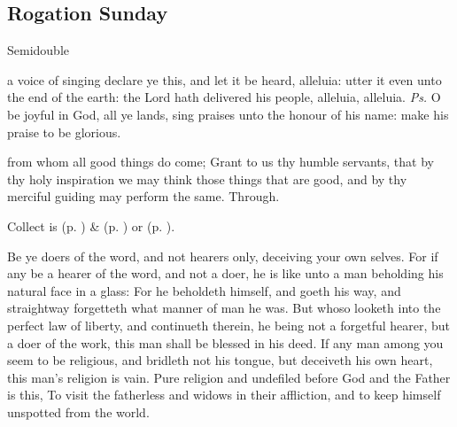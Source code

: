 \clearpage
\subsection{Rogation Sunday}
\begin{inhead}
    {Semidouble}
\end{inhead}


\introit
{} a voice of singing declare ye this, and let it be heard, alleluia: utter it even unto the end of the earth: the Lord hath delivered his people, alleluia, alleluia. \textit{Ps.} O be joyful in God, all ye lands, sing praises unto the honour of his name: make his praise to be glorious.

\collect
{} from whom all good things do come; Grant to us thy humble servants, that by thy holy inspiration we may think those things that are good, and by thy merciful guiding may perform the same. Through.
\begin{rubric}
     Collect is  (p. \pageref{SPMaryInEaster}) \&   (p. \pageref{SPAgainst}) or  (p. \pageref{SPChiefBishop}).
\end{rubric}

 Be ye doers of the word, and not hearers only, deceiving your own selves. For if any be a hearer of the word, and not a doer, he is like unto a man beholding his natural face in a glass: For he beholdeth himself, and goeth his way, and straightway forgetteth what manner of man he was. But whoso looketh into the perfect law of liberty, and continueth therein, he being not a forgetful hearer, but a doer of the work, this man shall be blessed in his deed. If any man among you seem to be religious, and bridleth not his tongue, but deceiveth his own heart, this man's religion is vain. Pure religion and undefiled before God and the Father is this, To visit the fatherless and widows in their affliction, and to keep himself unspotted from the world.


